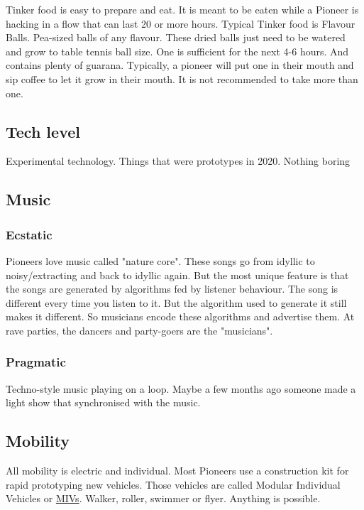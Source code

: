 Tinker food is easy to prepare and eat. It is meant to be eaten while a Pioneer is hacking in a flow that can last 20 or more hours. Typical Tinker food is Flavour Balls. Pea-sized balls of any flavour. These dried balls just need to be watered and grow to table tennis ball size. One is sufficient for the next 4-6 hours. And contains plenty of guarana.
Typically, a pioneer will put one in their mouth and sip coffee to let it grow in their mouth. It is not recommended to take more than one.

\subsection{Tech level}

Experimental technology. Things that were prototypes in 2020. Nothing boring

\subsection{Music}

\subsubsection{Ecstatic}

Pioneers love music called "nature core". These songs go from idyllic to noisy/extracting and back to idyllic again. But the most unique feature is that the songs are generated by algorithms fed by listener behaviour.
The song is different every time you listen to it. But the algorithm used to generate it still makes it different. So musicians encode these algorithms and advertise them. At rave parties, the dancers and party-goers are the "musicians".

\subsubsection{Pragmatic}

Techno-style music playing on a loop. Maybe a few months ago someone made a light show that synchronised with the music.

\subsection{Mobility}

All mobility is electric and individual. Most Pioneers use a construction kit for rapid prototyping new vehicles. Those vehicles are called Modular Individual Vehicles or \hyperref[sec:MIV]{MIVs}. Walker, roller, swimmer or flyer. Anything is possible.

